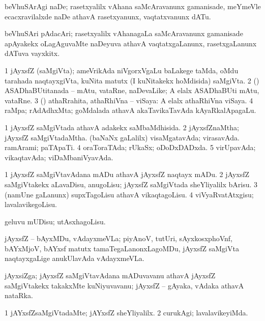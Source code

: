 \bentry
{}
\gl{\akirx}
\bmng
beVhuSArAgi naDe; rasetxyalilx vAhana saMcAravanunx gamanisade, meYmeVle ecacxravilalxde naDe athavA rasetxyanunx, vaqtatxvanunx dATu. 
\emng
\eentry

\bentry
{}
\gl{\nA}
\bmng
beVhuSAri pAdacAri; rasetxyalilx vAhanagaLa saMcAravanunx gamanisade apAyakekx oLagAguvaMte naDeyuva athavA vaqtatxgaLanunx, rasetxgaLanunx dATuva vayxkitx. 
\emng
\eentry

\bentry
{}
\gl{\nA}
\bmng
\bnum
\num{1} jAyxsfZ (saMgiVta); ameVrikAda niVgorxVgaLu baLakege taMda, oMdu tarahada naqtayxgiVta, kuNita matutx (I kuNitakekx hoMdisida) saMgiVta. 
\num{2} (\ashi) ASADhaBUtitanada -- mAtu, vataRne, naDevaLike;  A elalx ASADhaBUti mAtu, vataRne. 
\num{3} (\ashi) athaRrahita, athaRhiVna -- viSaya:  A elalx athaRhiVna viSaya. 
\num{4} raMpa; rAdAdhxMta; goMdalada athavA akaTavikaTavAda kAyaRkalApagaLu. 
\enum
\emng
\eentry

\bentry
{}
\gl{\gu}
\bmng
\bnum
\num{1} jAyxsfZ saMgiVtada athavA adakekx saMbaMdhisida. 
\num{2} jAyxsfZnaMtha; jAyxsfZ saMgiVtadaMtha. 
 (baNaNx \mo gaLalilx) 
\banum
{} visaMgatavAda; virasavAda. 
 ramArami; paTApaTi. 
\eanum
\numie
\num{4} oraToraTAda; rUkaSx; oDoDxDADxda. 
\num{5} virUpavAda; vikaqtavAda; viDaMbaniVyavAda. 
\enum
\emng
\eentry

\bentry
{}
\gl{\sakirx}
\bmng
\bnum
\num{1} jAyxsfZ saMgiVtavAdana mADu athavA jAyxsfZ naqtayx mADu. 
\num{2} jAyxsfZ saMgiVtakekx aLavaDisu, anugoLisu; jAyxsfZ saMgiVtada sheYliyalilx bArisu. 
\num{3} (namUne \mo gaLanunx) supxTagoLisu athavA vikaqtagoLisu. 
\num{4} viVyaRvatAtxgisu; lavalavikegoLisu. 
\enum
\emng

\noindent
\gl{\nuga}
\bmng
{} geluvu mUDisu; utAsxhagoLisu. 
\emng
\eentry

\bentry
{}
\gl{\nA}
\bmng
jAyxsfZ -- bAyxMDu, vAdayxmeVLa; piyAnoV, tutUri, sAyxkosxphoVnf, bAYxMjoV, bAYxsf matutx tamaTegaLanonxLagoMDu, jAyxsfZ saMgiVta naqtayxgaLige anukUlavAda vAdayxmeVLa. 
\emng
\eentry

\bentry
{}
\gl{\nA}
\bmng
jAyxsiZga; jAyxsfZ saMgiVtavAdana mADuvavanu athavA jAyxsfZ saMgiVtakekx takakxMte kuNiyuvavanu; jAyxsfZ -- gAyaka, vAdaka athavA nataRka. 
\emng
\eentry

\bentry
{}
\gl{\kirxvi}
\bmng
\bnum
\num{1} jAYxsfZsaMgiVtadaMte; jAYxsfZ sheYliyalilx. 
\num{2} curukAgi; lavalavikeyiMda. 
\enum
\emng
\eentry

